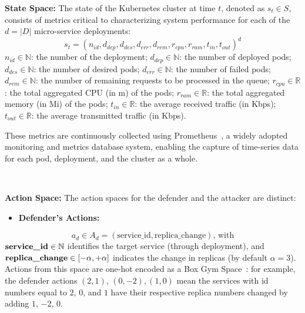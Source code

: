 \documentclass[conference]{IEEEtran}
\begin{document}
\noindent \textbf{State Space:} The state of the Kubernetes cluster at time $t$, denoted as $s_t \in S$, consists of metrics critical to characterizing system performance for each of the $d = |D|$ micro-service deployments:
$$
s_t = (n_{id}, d_{dep}, d_{des}, d_{err}, d_{rem}, r_{cpu}, r_{ram}, t_{in}, t_{out})^d
$$
$n_{id} \in \mathbb{N}$: the number of the deployment; \quad
$d_{dep} \in \mathbb{N}$: the number of deployed pods; \quad 
$d_{des} \in \mathbb{N}$: the number of desired pods; \quad
$d_{err} \in \mathbb{N}$: the number of failed pods; \quad
$d_{rem} \in \mathbb{N}$: the number of remaining requests to be processed in the queue; \quad
$r_{cpu} \in \mathbb{R}$: the total aggregated CPU (in m) of the pods; \quad
$r_{ram} \in \mathbb{R}$: the total aggregated memory (in Mi) of the pods; \quad
$t_{in} \in \mathbb{R}$: the average received traffic (in Kbps); \quad
$t_{out} \in \mathbb{R}$: the average transmitted traffic (in Kbps).

These metrics are continuously collected using Prometheus~\cite{prometheus}, a widely adopted monitoring and metrics database system, enabling the capture of time-series data for each pod, deployment, and the cluster as a whole. 

\

\noindent \textbf{Action Space:} The action spaces for the defender and the attacker are distinct:\\
\begin{itemize}
    \item \textbf{Defender's Actions:} 
\end{itemize}
$$
a_d \in A_d = (\text{service\_id}, \text{replica\_change}) \text{, with}
$$
$\text{\textbf{service\_id}} \in \mathbb{N}$ identifies the target service (through deployment), and $\text{\textbf{replica\_change}} \in [-\alpha, +\alpha]$ indicates the change in replicas (by default $\alpha = 3$). Actions from this space are one-hot encoded as a Box Gym Space~\cite{openAIGymActionSpaces}: for example, the defender actions $(2,1)$, $(0,-2), (1,0)$ mean the services with id numbers equal to $2$, $0$, and $1$ have their respective replica numbers changed by adding $1$, $-2$, $0$.\\
\end{document}
